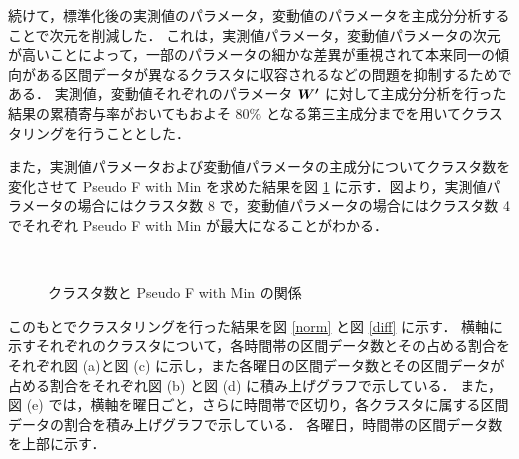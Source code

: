 \documentclass[a4j]{jarticle}
\def \vector#1{\mbox{\boldmath $#1$}}
\begin{document}
続けて，標準化後の実測値のパラメータ，変動値のパラメータを主成分分析\cite{jolliffe2016principal}することで次元を削減した．
これは，実測値パラメータ，変動値パラメータの次元が高いことによって，一部のパラメータの細かな差異が重視されて本来同一の傾向がある区間データが異なるクラスタに収容されるなどの問題を抑制するためである．
実測値，変動値それぞれのパラメータ $\vector{W^\prime}$ に対して主成分分析を行った結果の累積寄与率がおいてもおよそ $80\%$ となる第三主成分までを用いてクラスタリングを行うこととした．

また，実測値パラメータおよび変動値パラメータの主成分についてクラスタ数を変化させて Pseudo F with Min を求めた結果を図 \ref{PseudoFwithMinPlot} に示す．図より，実測値パラメータの場合にはクラスタ数 8 で，変動値パラメータの場合にはクラスタ数 4 でそれぞれ Pseudo F with Min が最大になることがわかる．

\begin{figure}[tb]
\begin{center}
~
\caption{クラスタ数と Pseudo F with Min の関係}
\label{PseudoFwithMinPlot}
\end{center}
\end{figure}

このもとでクラスタリングを行った結果を図 \ref{norm} と図 \ref{diff} に示す．
横軸に示すそれぞれのクラスタについて，各時間帯の区間データ数とその占める割合をそれぞれ図 (a)と図 (c) に示し，また各曜日の区間データ数とその区間データが占める割合をそれぞれ図 (b) と図 (d) に積み上げグラフで示している．
また，図 (e) では，横軸を曜日ごと，さらに時間帯で区切り，各クラスタに属する区間データの割合を積み上げグラフで示している．
各曜日，時間帯の区間データ数を上部に示す．
\end{document}
